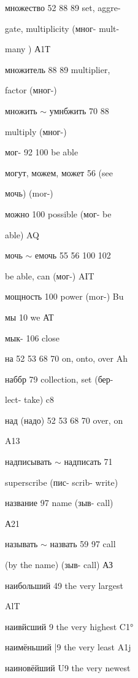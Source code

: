 \begin{minipage}[t]{0.475\textwidth}
\raggedright
\noindent множество 52 88 89 set, aggre-\par
\noindent gate, multiplicity (мног- mult-\par
\noindent many ) А1Т\par
\noindent множитель 88 89 multiplier,\par
\noindent factor (мног-)\par
\noindent множить $\sim$ умнбжить 70 88\par
\noindent multiply (мног-)\par
\noindent мог- 92 100 be able\par
\noindent могут, можем, может 56 (see\par
\noindent мочь) (mor-)\par
\noindent можно 100 possible (мог- be\par
\noindent able) AQ\par
\noindent мочь $\sim$ емочь 55 56 100 102\par
\noindent be able, can (мог-) AIT\par
\noindent мощность 100 power (mor-) Bu\par
\noindent мы 10 we АТ\par
\noindent мык- 106 close\par
\noindent на 52 53 68 70 on, onto, over Ah\par
\noindent наббр 79 collection, set (бер-\par
\noindent lect- take) c8\par
\noindent над (надо) 52 53 68 70 over, on\par
\noindent A13\par
\noindent надписывать $\sim$ надписать 71\par
\noindent superscribe (пис- scrib- write)\par
\noindent название 97 name (зыв- call)\par
\noindent А21\par
\noindent называть $\sim$ назвать 59 97 call\par
\noindent (by the name) (зыв- call) АЗ\par
\noindent наибольший 49 the very largest\par
\noindent AlT\par
\noindent наивйсший 9 the very highest C1°\par
\noindent наимёньший |9 the very least A1j\par
\noindent наиновёйший U9 the very newest\par

\end{minipage}

